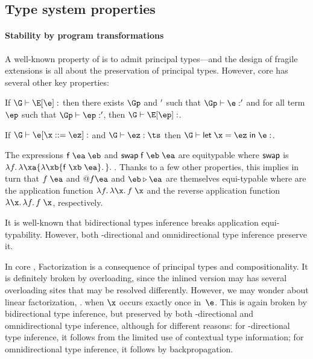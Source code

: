 \documentclass[acmsmall,screen,nonacm]{acmart}
\begin{document}
\subsection{Type system properties}
\label{sec:constraint-prop}


\paragraph{Stability by program transformations}

A well-known property of \ML is to admit principal types---and the design of
fragile \ML extensions is all about the preservation of principal types.
However, core \ML has several other key properties:
\begin{description}[font=\it,align=mydesc,topsep=1ex,itemsep=1ex,leftmargin=0ex]
\newcommand {\eswap}{\mathprefix  {swap}}

\item [Compositionality]
  If $\G \th \E \where \e : \t$ then there exists $\Gp$ and $\relax'$ such that
  $\Gp \th \e : \tp$ and for all term $\ep$ such that $\Gp \th \ep : \tp$,
  then $\G \th \E \where \ep : \t$.

\item [Factorization]
  If $\G \th \e \where {\x \is \ez} : \t$ and $\G \th \ez : \ts$ then
  $\G \th \elet \x \ez \e : \t$.


\item [Application equitypability]
  The expressions $\eappp f \ea \eb$ and $\eappp {\eswap f} \eb \ea$ are
  equitypable where $\eswap$ is $\efun f {\efun \xa {\efun \xb {\eappp f \xb
  \ea}}}$.  Thanks to a few other properties, this implies in turn that
  $\eapp f \ea$ and $\eApp f \ea$ and $\eb \ePipe \ea$ are themselves
  equi-typable where are the application function $\efun f \efun \x \eapp f
  \x$ and the reverse application function $\efun \x \efun f \eapp f \x$,
  respectively.

\end{description}
It is well-known that bidirectional types inference breaks application
equi-typability. However, both \Geninst-directional and omnidirectional type
inference preserve it.

In core \ML, Factorization is a consequence of principal types and
compositionality.  It is definitely broken by overloading, since the inlined
version may has several overloading sites that may be resolved differently.
However, we may wonder about linear factorization, \ie. when $\x$ occurs
exactly once in~$\e$.  This is again broken by bidirectional type inference,
but preserved by both \Geninst-directional and omnidirectional type inference,
although for different reasons: for \Geninst-directional type inference, it
follows from the limited use of contextual type information; for
omnidirectional type inference, it follows by backpropagation.
\end{document}
